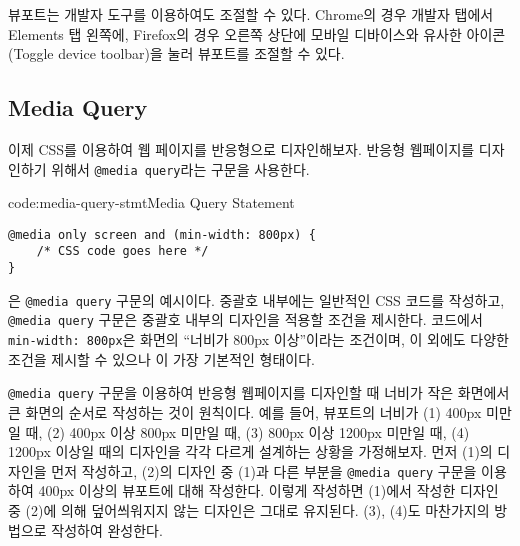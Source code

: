 뷰포트는 개발자 도구를 이용하여도 조절할 수 있다. Chrome의 경우 개발자 탭에서 Elements 탭 왼쪽에, Firefox의 경우 오른쪽 상단에 모바일 디바이스와 유사한 아이콘(Toggle device toolbar)을 눌러 뷰포트를 조절할 수 있다.

\subsection*{Media Query}
이제 CSS를 이용하여 웹 페이지를 반응형으로 디자인해보자. 반응형 웹페이지를 디자인하기 위해서 \texttt{@media query}라는 구문을 사용한다.

\begin{codeenv}{code:media-query-stmt}{Media Query Statement}\begin{verbatim}
@media only screen and (min-width: 800px) {
    /* CSS code goes here */   
}
\end{verbatim}
\end{codeenv}

은 \texttt{@media query} 구문의 예시이다. 중괄호 내부에는 일반적인 CSS 코드를 작성하고, \texttt{@media query} 구문은 중괄호 내부의 디자인을 적용할 조건을 제시한다. 코드에서 \texttt{min-width: 800px}은 화면의 ``너비가 800px 이상''이라는 조건이며, 이 외에도 다양한 조건을 제시할 수 있으나 이 가장 기본적인 형태이다.

\texttt{@media query} 구문을 이용하여 반응형 웹페이지를 디자인할 때 너비가 작은 화면에서 큰 화면의 순서로 작성하는 것이 원칙이다. 예를 들어, 뷰포트의 너비가 (1) 400px 미만일 때, (2) 400px 이상 800px 미만일 때, (3) 800px 이상 1200px 미만일 때, (4) 1200px 이상일 때의 디자인을 각각 다르게 설계하는 상황을 가정해보자. 먼저 (1)의 디자인을 먼저 작성하고, (2)의 디자인 중 (1)과 다른 부분을 \texttt{@media query} 구문을 이용하여 400px 이상의 뷰포트에 대해 작성한다. 이렇게 작성하면 (1)에서 작성한 디자인 중 (2)에 의해 덮어씌워지지 않는 디자인은 그대로 유지된다. (3), (4)도 마찬가지의 방법으로 작성하여 완성한다.
